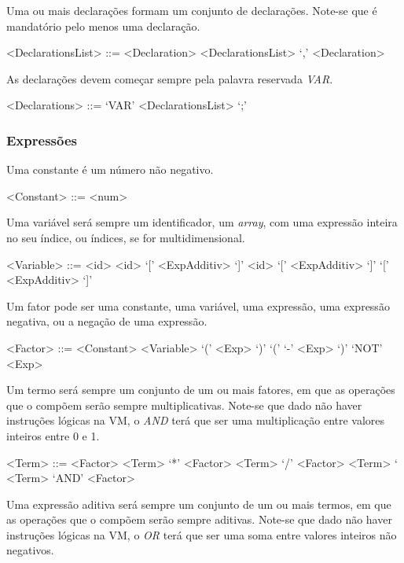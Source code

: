 Uma ou mais declarações formam um conjunto de declarações. Note-se que
é mandatório pelo menos uma declaração.

\begin{grammar}
<DeclarationsList> ::= <Declaration> 
\alt <DeclarationsList> `,' <Declaration> 
\end{grammar}

As declarações devem começar sempre pela palavra reservada \emph{VAR}.

\begin{grammar}
<Declarations> ::= `VAR' <DeclarationsList> `;' 
\end{grammar}


\subsubsection{Expressões}
\label{subsec:subsubsec:expressoes:desenho}

Uma constante é um número não negativo.

\begin{grammar}
<Constant> ::= <num>
\end{grammar}

Uma variável será sempre um identificador, um \emph{array}, com uma expressão
inteira no seu índice, ou índices, se for multidimensional.

\begin{grammar}
<Variable> ::= <id>
\alt <id> `[' <ExpAdditiv> `]'
\alt <id> `[' <ExpAdditiv> `]' `[' <ExpAdditiv> `]' 
\end{grammar} 

Um fator pode ser uma constante, uma variável, uma expressão, uma expressão
negativa, ou a negação de uma expressão.
\begin{grammar}
<Factor> ::= <Constant>
\alt <Variable>
\alt `(' <Exp> `)'
\alt `(' `-' <Exp> `)'
\alt `NOT' <Exp>
\end{grammar}


Um termo será sempre um conjunto de um ou mais fatores, em que as operações que o compõem
serão sempre multiplicativas. Note-se que dado não haver instruções lógicas na
VM, o \emph{AND} terá que ser uma multiplicação entre valores inteiros entre
0 e 1. 

\begin{grammar}
<Term> ::= <Factor>
\alt <Term> `*'  <Factor>
\alt <Term> `/' <Factor>
\alt <Term> `%
\alt <Term> `AND' <Factor>
\end{grammar}


Uma expressão aditiva será sempre um conjunto de um ou mais termos, em que as operações que o compõem
serão sempre aditivas. Note-se que dado não haver instruções lógicas na
VM, o \emph{OR} terá que ser uma soma entre valores inteiros não negativos.

